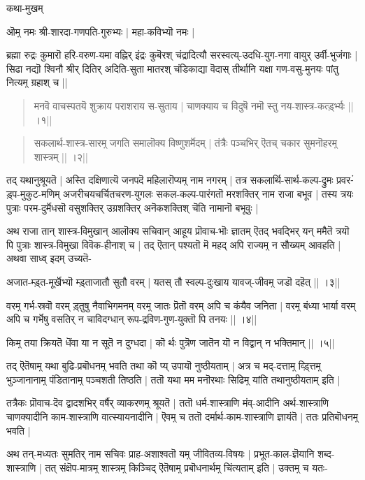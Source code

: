 \documentclass{article}
\begin{document}
कथा-मुखम्

ऒम्̣ नमः श्री-शारदा-गणपति-गुरुभ्यः | महा-कविभ्यॊ नमः |

ब्रह्मा रुद्रः कुमारॊ हरि-वरुण-यमा वह्निर् इंद्रः कुबॆरश्
चंद्रादित्यौ सरस्वत्य्-उदधि-युग-नगा वायुर् उर्वी-भुजंगाः |
सिढा नद्यॊ श्विनौ श्रीर् दितिर् अदिति-सुता मातरश् चंडिकाद्या
वॆदास् तीर्थानि यक्षा गण-वसु-मुनयः पांतु नित्यम्̣ ग्रहाश् च ||

\begin{verse}
मनवॆ वाचस्पतयॆ शुक्राय पराशराय स-सुताय |
चाणक्याय च विदुषॆ नमॊ स्तु नय-शास्त्र-कर्त्ड़्भ्यः || ।१||
\end{verse}

\begin{verse}
सकलार्थ-शास्त्र-सारम्̣ जगति समालॊक्य विष्णुशर्मॆदम् |
तंत्रैः पञ्चभिर् ऎतच् चकार सुमनॊहरम्̣ शास्त्रम् || ।२||
\end{verse}

तद् यथानुश्रूयतॆ | अस्ति दक्षिणात्यॆ जनपदॆ महिलारॊप्यम्̣ नाम नगरम् | तत्र सकलार्थि-सार्थ-कल्प-द्रुमः प्रवर-ंड़्प-मुकुट-मणिम् अजरीचयचर्चितचरण-युगलः सकल-कल्प-पारंगतॊ मरशक्तिर् नाम राजा बभूव | तस्य त्रयः पुत्राः परम-दुर्मॆधसॊ वसुशक्तिर् उग्रशक्तिर् अनॆकशक्तिश् चॆति नामानॊ बभूवुः |

अथ राजा तान् शास्त्र-विमुखान् आलॊक्य सचिवान् आहूय प्रॊवाच-भॊः ज्ञातम् ऎतद् भवद्भिर् यन् ममैतॆ त्रयॊ पि पुत्राः शास्त्र-विमुखा विवॆक-हीनाश् च | तद् ऎतान् पश्यतॊ मॆ महद् अपि राज्यम्̣ न सौख्यम् आवहति | अथवा साध्व् इदम् उच्यतॆ-

अजात-म्ड़्त-मूर्खॆभ्यॊ म्ड़्ताजातौ सुतौ वरम् |
यतस् तौ स्वल्प-दुःखाय यावज्-जीवम्̣ जडॊ दहॆत् || ।३||

वरम्̣ गर्भ-स्रवॊ वरम् ड़्तुषु नैवाभिगमनम्
वरम्̣ जातः प्रॆतॊ वरम् अपि च कंयैव जनिता |
वरम्̣ बंध्या भार्या वरम् अपि च गर्भॆषु वसतिर्
न चाविदग्धान् रूप-द्रविण-गुण-युक्तॊ पि तनयः || ।४||

किम्̣ तया क्रियतॆ धॆंवा या न सूतॆ न दुग्धदा |
कॊ र्थः पुत्रॆण जातॆन यॊ न विद्वान् न भक्तिमान् || ।५||

तद् ऎतॆषाम्̣ यथा बुढि-प्रबॊधनम्̣ भवति तथा कॊ प्य् उपायॊ नुष्ठीयताम् | अत्र च मद्-दत्ताम्̣ व्ड़्त्तिम्̣ भुञ्जानानाम्̣ पंडितानाम्̣ पञ्चशती तिष्ठति | ततॊ यथा मम मनॊरथाः सिढिम्̣ यांति तथानुष्ठीयताम् इति |

तत्रैकः प्रॊवाच-दॆव द्वादशभिर् वर्षैर् व्याकरणम्̣ श्रूयतॆ | ततॊ धर्म-शास्त्राणि मंव्-आदीनि अर्थ-शास्त्राणि चाणक्यादीनि काम-शास्त्राणि वात्स्यायनादीनि | ऎवम्̣ च ततॊ दर्मार्थ-काम-शास्त्राणि ज्ञायंतॆ | ततः प्रतिबॊधनम्̣ भवति |

अथ तन्-मध्यतः सुमतिर् नाम सचिवः प्राह-अशाश्वतॊ यम्̣ जीवितव्य-विषयः | प्रभूत-काल-ज्ञॆयानि शब्द-शास्त्राणि | तत् संक्षॆप-मात्रम्̣ शास्त्रम्̣ किञ्चिद् ऎतॆषाम्̣ प्रबॊधनार्थम्̣ चिंत्यताम् इति | उक्तम्̣ च यतः-
\end{document}
